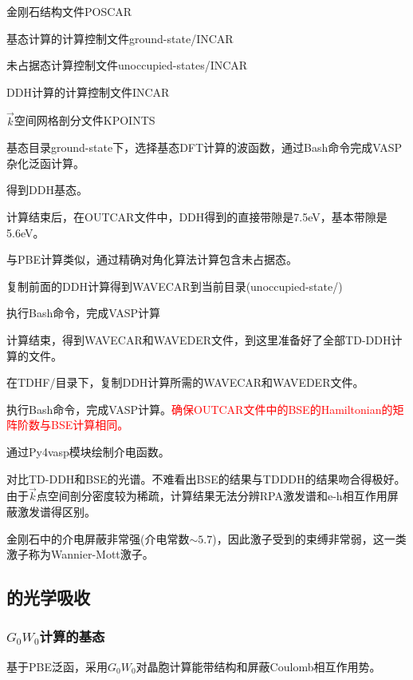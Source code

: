 金刚石结构文件\textrm{POSCAR}

基态计算的计算控制文件\textrm{ground-state/INCAR}

未占据态计算控制文件\textrm{unoccupied-states/INCAR}

\textrm{DDH}计算的计算控制文件\textrm{INCAR}

$\vec k$空间网格剖分文件\textrm{KPOINTS}

基态目录\textrm{ground-state}下，选择基态\textrm{DFT}计算的波函数，通过\textrm{Bash}命令完成\textrm{VASP}杂化泛函计算。

得到\textrm{DDH}基态。

计算结束后，在\textrm{OUTCAR}文件中，\textrm{DDH}得到的直接带隙是7.5\textrm{eV}，基本带隙是\textrm{5.6}\textrm{eV}。

与\textrm{PBE}计算类似，通过精确对角化算法计算包含未占据态。

复制前面的\textrm{DDH}计算得到\textrm{WAVECAR}到当前目录\textrm{(unoccupied-state/)}

执行\textrm{Bash}命令，完成\textrm{VASP}计算

计算结束，得到\textrm{WAVECAR}和\textrm{WAVEDER}文件，到这里准备好了全部\textrm{TD-DDH}计算的文件。

在\textrm{TDHF/}目录下，复制\textrm{DDH}计算所需的\textrm{WAVECAR}和\textrm{WAVEDER}文件。

执行\textrm{Bash}命令，完成\textrm{VASP}计算。\textcolor{red}{确保\textrm{OUTCAR}文件中的\textrm{BSE}的\textrm{Hamiltonian}的矩阵阶数与\textrm{BSE}计算相同。}

通过\textrm{Py4vasp}模块绘制介电函数。

对比\textrm{TD-DDH}和\textrm{BSE}的光谱。不难看出\textrm{BSE}的结果与\textrm{TDDDH}的结果吻合得极好。由于$\vec k$点空间剖分密度较为稀疏，计算结果无法分辨\textrm{RPA}激发谱和\textrm{e-h}相互作用屏蔽激发谱得区别。%

金刚石中的介电屏蔽非常强(介电常数$\sim5.7$)，因此激子受到的束缚非常弱，这一类激子称为\textrm{Wannier-Mott}激子。%

\subsection{的光学吸收}
\subsubsection{$G_0W_0$计算的基态}
基于\textrm{PBE}泛函，采用$G_0W_0$对晶胞计算能带结构和屏蔽\textrm{Coulomb}相互作用势。

